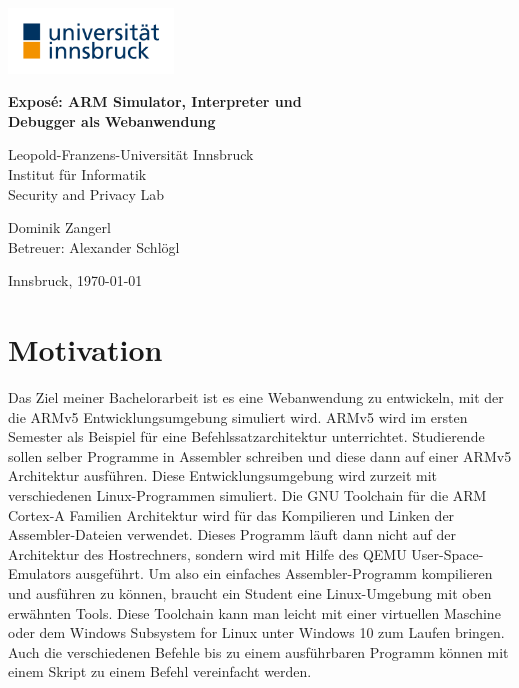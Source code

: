\documentclass[a4paper, 11pt, onecolumn]{article}
\providecommand{\keywords}[1]
{
  \noindent \textbf{Schlüsselwörter } #1
}
\begin{document}
\renewcommand{\abstractname}{Kurzfassung}
    \begin{center}

        \includegraphics[width=0.33\textwidth]{data/uibk} 
        
		\LARGE
        \textbf{Exposé: ARM Simulator, Interpreter und\\Debugger als Webanwendung\\}
        
		\vspace{0.2cm}        
            
        \large
        Leopold-Franzens-Universität Innsbruck\\
        Institut für Informatik\\
		Security and Privacy Lab
		
		\vspace{0.4cm}   
		
		\Large  
        Dominik Zangerl\\
		Betreuer: Alexander Schlögl  
                
        \vspace{0.4cm}
        
        \large    
        Innsbruck, \today
           
    \end{center}
    
%
%
%

\section{Motivation}

Das Ziel meiner Bachelorarbeit ist es eine Webanwendung zu entwickeln, mit der die ARMv5 Entwicklungsumgebung simuliert wird. ARMv5 \cite{arm:2005} wird im ersten Semester als Beispiel für eine Befehlssatzarchitektur unterrichtet. Studierende sollen selber Programme in Assembler schreiben und diese dann auf einer ARMv5 Architektur ausführen. Diese Entwicklungsumgebung wird zurzeit mit verschiedenen Linux-Programmen simuliert. Die GNU Toolchain für die ARM Cortex-A Familien Architektur \cite{gnutoolchain} wird für das Kompilieren und Linken der Assembler-Dateien verwendet. Dieses Programm läuft dann nicht auf der Architektur des Hostrechners, sondern wird mit Hilfe des QEMU User-Space-Emulators \cite{qemu} ausgeführt. Um also ein einfaches Assembler-Programm kompilieren und ausführen zu können, braucht ein Student eine Linux-Umgebung mit oben erwähnten Tools. Diese Toolchain kann man leicht mit einer virtuellen Maschine oder dem Windows Subsystem for Linux \cite{wsl} unter Windows 10 zum Laufen bringen. Auch die verschiedenen Befehle bis zu einem ausführbaren Programm können mit einem Skript zu einem Befehl vereinfacht werden.
\end{document}
